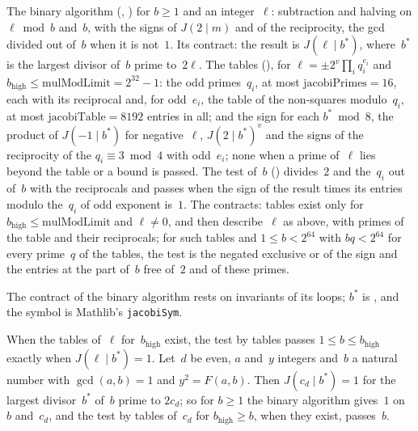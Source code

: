 \begin{definition}\label{def:jacobi}
  \leanok
  The binary algorithm (, ) for
  $b \ge 1$ and an integer~$\ell$: subtraction and halving on $\ell \bmod b$ and~$b$, with the signs
  of $J(2 \mid m)$ and of the reciprocity, the gcd divided out of~$b$ when it is not~$1$. Its
  contract: the result is $J(\ell \mid b^*)$, where~$b^*$ is the largest divisor of~$b$ prime
  to~$2\ell$. The tables (), for $\ell = \pm 2^v \prod_i q_i^{e_i}$
  and $b_{\mathrm{high}} \le \mathrm{mulModLimit} = 2^{32} - 1$: the odd primes~$q_i$, at most
  $\mathrm{jacobiPrimes} = 16$, each with its reciprocal and, for odd~$e_i$, the table of the
  non-squares modulo~$q_i$, at most $\mathrm{jacobiTable} = 8192$ entries in all; and the sign for
  each $b^* \bmod 8$, the product of $J(-1 \mid b^*)$ for negative~$\ell$, $J(2 \mid b^*)^v$ and the
  signs of the reciprocity of the $q_i \equiv 3 \bmod 4$ with odd~$e_i$; none when a prime of~$\ell$
  lies beyond the table or a bound is passed. The test of~$b$ ()
  divides~$2$ and the~$q_i$ out of~$b$ with the reciprocals and passes when the sign of the result
  times its entries modulo the~$q_i$ of odd exponent is~$1$. The contracts: tables exist only for
  $b_{\mathrm{high}} \le \mathrm{mulModLimit}$ and $\ell \ne 0$, and then describe~$\ell$ as above,
  with primes of the table and their reciprocals; for such tables and $1 \le b < 2^{64}$ with
  $b q < 2^{64}$ for every prime~$q$ of the tables, the test is the negated exclusive or of the sign
  and the entries at the part of~$b$ free of~$2$ and of these primes.
\end{definition}

The contract of the binary algorithm rests on invariants of its loops; $b^*$ is
, and the symbol is Mathlib's \verb|jacobiSym|.

\begin{lemma}\label{lem:jacobiTest}
  \leanok
  When the tables of~$\ell$ for~$b_{\mathrm{high}}$ exist, the test by tables passes
  $1 \le b \le b_{\mathrm{high}}$ exactly when $J(\ell \mid b^*) = 1$. Let~$d$ be even, $a$
  and~$y$ integers and~$b$ a natural number with $\gcd(a, b) = 1$ and $y^2 = F(a, b)$. Then
  $J(c_d \mid b^*) = 1$ for the largest divisor~$b^*$ of~$b$ prime to $2 c_d$; so for $b \ge 1$ the
  binary algorithm gives~$1$ on~$b$ and~$c_d$, and the test by tables of~$c_d$ for
  $b_{\mathrm{high}} \ge b$, when they exist, passes~$b$.
\end{lemma}

